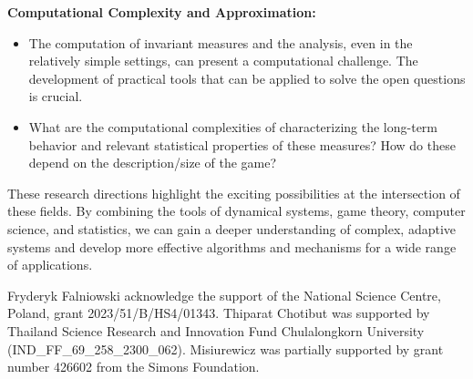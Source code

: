 \documentclass[format=acmsmall, authorversion, screen=true]{acmart}
\begin{document}
    \textbf{Computational Complexity and Approximation:}
      \begin{itemize}
        \item The computation of invariant measures and the analysis, even in the relatively simple settings, can present a computational challenge. The development of practical tools that can be applied to solve the open questions is crucial.
        \item What are the computational complexities of characterizing the long-term behavior and relevant statistical properties of these measures? How do these depend on the description/size of the game?
    \end{itemize}
  

These research directions highlight the exciting possibilities at the intersection of these fields. By combining the tools of dynamical systems, game theory, computer science, and statistics, we can gain a deeper understanding of complex, adaptive systems and develop more effective algorithms and mechanisms for a wide range of applications.

\begin{acks}
Fryderyk Falniowski acknowledge the support of the National Science Centre, Poland, grant 2023/51/B/HS4/01343.
Thiparat Chotibut was supported by Thailand Science Research and
  Innovation Fund Chulalongkorn University (IND\_FF\_69\_258\_2300\_062). 
Misiurewicz was partially supported by grant number 426602 from the Simons Foundation.
\end{acks}




\end{document}
